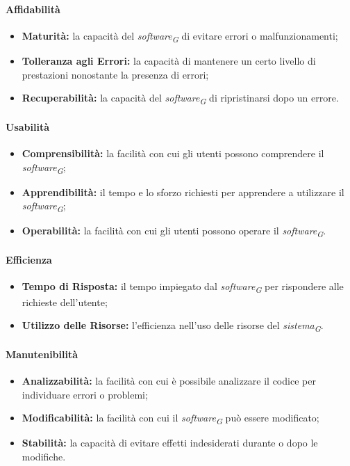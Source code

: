 \paragraph{Affidabilità}
\begin{itemize}
    \item \textbf{Maturità:} la capacità del \textit{software}\textsubscript{\textit{G}} di evitare errori o malfunzionamenti;
    \item \textbf{Tolleranza agli Errori:} la capacità di mantenere un certo livello di prestazioni nonostante la presenza di errori;
    \item \textbf{Recuperabilità:} la capacità del \textit{software}\textsubscript{\textit{G}} di ripristinarsi dopo un errore.
\end{itemize}

\paragraph{Usabilità}
\begin{itemize}
    \item \textbf{Comprensibilità:} la facilità con cui gli utenti possono comprendere il \textit{software}\textsubscript{\textit{G}};
    \item \textbf{Apprendibilità:} il tempo e lo sforzo richiesti per apprendere a utilizzare il \textit{software}\textsubscript{\textit{G}};
    \item \textbf{Operabilità:} la facilità con cui gli utenti possono operare il \textit{software}\textsubscript{\textit{G}}.
\end{itemize}

\paragraph{Efficienza}
\begin{itemize}
    \item \textbf{Tempo di Risposta:} il tempo impiegato dal \textit{software}\textsubscript{\textit{G}} per rispondere alle richieste dell'utente;
    \item \textbf{Utilizzo delle Risorse:} l'efficienza nell'uso delle risorse del \textit{sistema}\textsubscript{\textit{G}}.
\end{itemize}

\paragraph{Manutenibilità}
\begin{itemize}
    \item \textbf{Analizzabilità:} la facilità con cui è possibile analizzare il codice per individuare errori o problemi;
    \item \textbf{Modificabilità:} la facilità con cui il \textit{software}\textsubscript{\textit{G}} può essere modificato;
    \item \textbf{Stabilità:} la capacità di evitare effetti indesiderati durante o dopo le modifiche.
\end{itemize}

